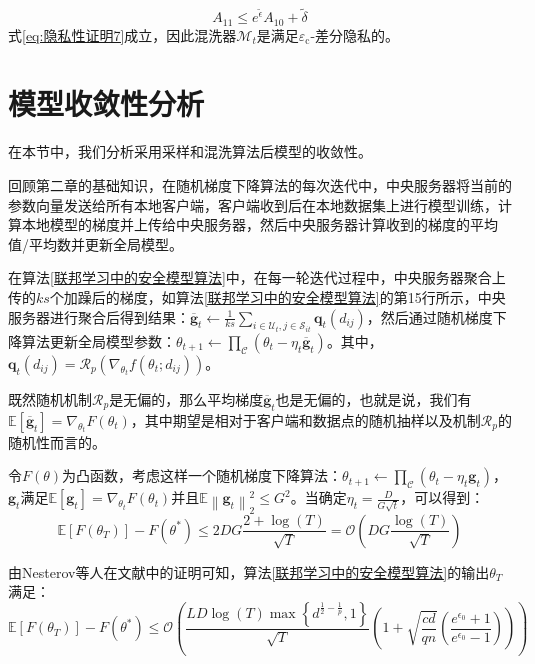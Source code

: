 \begin{equation}\label{隐私性证明9}
A_{11} \leq e^{\tilde{\epsilon}} A_{10}+\tilde{\delta}
\end{equation}
式\ref{eq:隐私性证明7}成立，因此混洗器$\mathcal{M}_{t}$是满足$\varepsilon_{\mathrm{c}}$-差分隐私的。

\section{模型收敛性分析}
在本节中，我们分析采用采样和混洗算法后模型的收敛性。

回顾第二章的基础知识，在随机梯度下降算法的每次迭代中，中央服务器将当前的参数向量发送给所有本地客户端，客户端收到后在本地数据集上进行模型训练，计算本地模型的梯度并上传给中央服务器，然后中央服务器计算收到的梯度的平均值/平均数并更新全局模型。

在算法\ref{联邦学习中的安全模型算法}中，在每一轮迭代过程中，中央服务器聚合上传的$ks$个加躁后的梯度，如算法\ref{联邦学习中的安全模型算法}的第15行所示，中央服务器进行聚合后得到结果：$\overline{\mathbf{g}}_{t} \leftarrow \frac{1}{k s} \sum_{i \in \mathcal{U}_{t}, j \in \mathcal{S}_{i t}} \boldsymbol{q}_{t}\left(d_{i j}\right)$，然后通过随机梯度下降算法更新全局模型参数：$\theta_{t+1} \leftarrow \prod_{\mathcal{C}}\left(\theta_{t}-\eta_{t} \overline{\mathbf{g}}_{t}\right)$。其中，$\mathbf{q}_{t}\left(d_{i j}\right)=\mathcal{R}_{p}\left(\nabla_{\theta_{t}} f\left(\theta_{t} ; d_{i j}\right)\right)$。

既然随机机制$\mathcal{R}_{p}$是无偏的，那么平均梯度$\overline{\mathbf{g}}_{t}$也是无偏的，也就是说，我们有 $\mathbb{E}\left[\overline{\mathbf{g}}_{t}\right]=\nabla_{\theta_{t}} F\left(\theta_{t}\right)$，其中期望是相对于客户端和数据点的随机抽样以及机制$\mathcal{R}_{p}$的随机性而言的。

令$F(\theta)$为凸函数，考虑这样一个随机梯度下降算法：$\theta_{t+1} \leftarrow \prod_{\mathcal{C}}\left(\theta_{t}-\eta_{t} \mathbf{g}_{t}\right)$，$\mathbf{g}_{t}$满足$\mathbb{E}\left[\mathbf{g}_{t}\right]=\nabla_{\theta_{t}} F\left(\theta_{t}\right)$并且$\mathbb{E}\left\|\mathbf{g}_{t}\right\|_{2}^{2} \leq G^{2}$。当确定$\eta_{t}=\frac{D}{G \sqrt{t}}$，可以得到：
\begin{equation}\label{eq：模型收敛性证明1}
\mathbb{E}\left[F\left(\theta_{T}\right)\right]-F\left(\theta^{*}\right) \leq 2 D G \frac{2+\log (T)}{\sqrt{T}}=\mathcal{O}\left(D G \frac{\log (T)}{\sqrt{T}}\right)
\end{equation} 

由Nesterov等人在文献中的证明可知，算法\ref{联邦学习中的安全模型算法}的输出$\theta_{T}$满足：
\begin{equation}\label{eq:模型收敛性证明2}
\mathbb{E}\left[F\left(\theta_{T}\right)\right]-F\left(\theta^{*}\right) \leq \mathcal{O}\left(\frac{L D \log (T) \max \left\{d^{\frac{1}{2}-\frac{1}{p}}, 1\right\}}{\sqrt{T}}\left(1+\sqrt{\frac{c d}{q n}}\left(\frac{e^{\epsilon_{0}}+1}{e^{\epsilon_{0}}-1}\right)\right)\right)
\end{equation}

